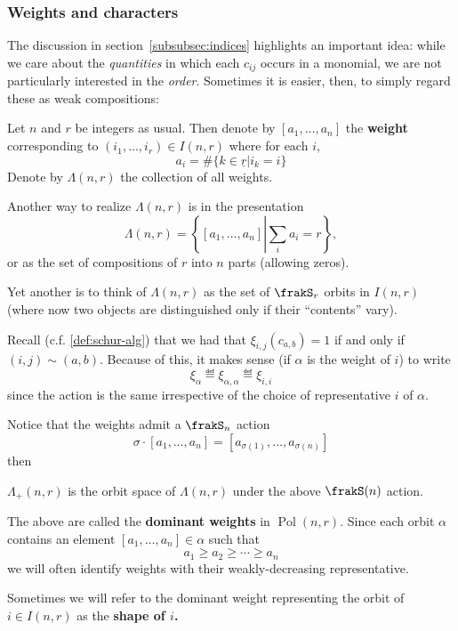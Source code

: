 \documentclass[12pt]{article}
\DeclareMathOperator{\Pol}{Pol}
\begin{document}
\subsubsection{Weights and characters}
The discussion in section~\ref{subsubsec:indices} highlights an important idea: while we care about the \textit{quantities} in which each $c_{ij}$ occurs 
in a monomial, we are not particularly interested in the \textit{order}. Sometimes it is easier, then, to simply regard these as weak compositions:
\begin{defn}
	Let $n$ and $r$ be integers as usual. Then denote by $[a_1,\dots,a_n]$ the \textbf{weight} corresponding to 
	$(i_1,\dots,i_r)\in I(n,r)$ where for each $i$,
	\[a_i=\#\{k\in\underline r| i_k=i\}\]
	Denote by $\Lambda(n,r)$ the collection of all weights. 
\end{defn}
\begin{rmk}
	Another way to realize $\Lambda(n,r)$ is in the presentation 
	\[\Lambda(n,r)=\left\{[a_1,\dots,a_n]\left|\sum_i a_i=r\right.\right\},\]
	or as the set of compositions of $r$ into $n$ parts (allowing zeros).
	
	Yet another is to think of $\Lambda(n,r)$ as the set of $\frakS_r$ orbits in $I(n,r)$ (where now two objects 
	are distinguished only if their ``contents'' vary).
\end{rmk}
Recall (c.f. \ref{def:schur-alg}) that we had that $\xi_{i,j}(c_{a,b})=1$ if and only if $(i,j)\sim(a,b)$. Because of this, it makes sense (if $\alpha$ is the 
weight of $i$) to write 
\[\xi_{\alpha}\eqdef \xi_{\alpha,\alpha}\eqdef \xi_{i,i}\]
since the action is the same irrespective of the choice of representative $i$ of $\alpha.$

Notice that the weights admit a $\frakS_n$ action 
\[\sigma\cdot [a_1,\dots,a_n]=[a_{\sigma(1)},\dots,a_{\sigma(n)}]\]
then 
\begin{defn}
	$\Lambda_+(n,r)$ is the orbit space of $\Lambda(n,r)$ under the above $\frakS(n)$ action.
\end{defn}
\begin{rmk}
	The above are called the \textbf{dominant weights} in $\Pol(n,r)$. Since each orbit $\alpha$ contains an element $[a_1,\dots,a_n]\in\alpha$ such that 
	\[a_1\ge a_2\ge\cdots\ge a_n\]
	we will often identify weights with their weakly-decreasing representative.

	Sometimes we will refer to the dominant weight representing the orbit of $i\in I(n,r)$ as the \textbf{shape of $i$.}
\end{rmk}
\end{document}
